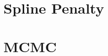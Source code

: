 \documentclass[12pt,twoside]{report}
\begin{document}


\begin{appendices}
\makeatletter
{}
\makeatother
 \chapter{Spline Penalty}
 
 \chapter{MCMC}
  
\end{appendices}



\clearemptydoublepage
\end{document}
